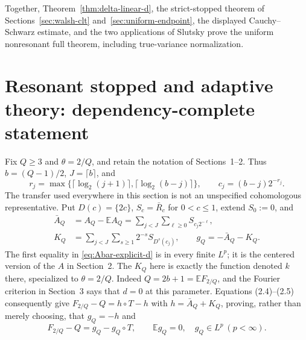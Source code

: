 \documentclass[11pt]{article}
\numberwithin{equation}{section}
\newcommand{\1}{\mathbf 1}\newcommand{\F}{\mathcal F}\newcommand{\D}{\mathcal D}
\begin{document}
Together, Theorem~\ref{thm:delta-linear-d}, the strict-stopped theorem of
Sections~\ref{sec:walsh-clt} and~\ref{sec:uniform-endpoint}, the displayed
Cauchy--Schwarz estimate, and the two applications of Slutsky prove the
uniform nonresonant full theorem,
including true-variance normalization.

\section{Resonant stopped and adaptive theory: dependency-complete statement}
\label{sec:resonant-dossier}
Fix $Q\ge3$ and $\theta=2/Q$, and retain the notation of
Sections~1--2.  Thus $b=(Q-1)/2$, $J=\lceil b\rceil$, and
\[
 r_j=\max\{\lceil\log _2(j+1)\rceil,
                 \lceil\log _2(b-j)\rceil\},\qquad
 c_j=(b-j)2^{-r_j}.
\]
The transfer used everywhere in this section is not an unspecified
cohomologous representative.  Put $D(c)=\{2c\}$, $S_c=\bar R_c$ for $0<c\le1$, extend
$S_0:=0$, and
\begin{align}
 \bar A_Q&=A_Q-\mathbb EA_Q
   =\sum_{j<J}\sum_{\ell\ge0}S_{c_j2^{-\ell}},\label{eq:Abar-explicit-d}\\
 K_Q&=\sum_{j<J}\sum_{s\ge1}2^{-s}S_{D^s(c_j)},\qquad
 g_Q=-\bar A_Q-K_Q.                                   \label{eq:g-explicit-d}
\end{align}
The first equality in \eqref{eq:Abar-explicit-d} is in every finite $L^p$;
it is the centered version of the $A$ in Section~2.  The $K_Q$ here is
exactly the function denoted $k$ there, specialized to $\theta=2/Q$.
Indeed $Q=2b+1=\mathbb EF_{2/Q}$, and the Fourier criterion in Section~3
says that $d=0$ at this parameter.  Equations (2.4)--(2.5) consequently give
$F_{2/Q}-Q=h\circ T-h$ with $h=\bar A_Q+K_Q$, proving, rather than merely
choosing, that $g_Q=-h$ and
\begin{equation}F_{2/Q}-Q=g_Q-g_Q\circ T,\qquad \mathbb Eg_Q=0,\quad g_Q\in L^p\ (p<\infty). \label{eq:res-cob}
\end{equation}
\end{document}
